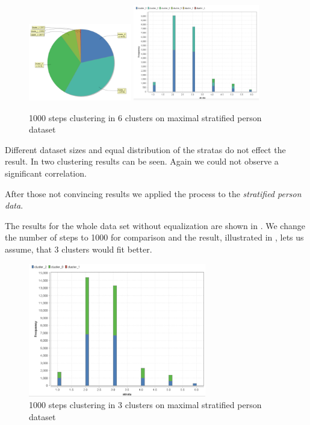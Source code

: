 \begin{figure}[H]
	\centering
	\includegraphics[width=0.4\textwidth]{vectorclusteringcluster1000.PNG}
	\includegraphics[width=0.49\textwidth]{vectorClustering1000.PNG}
	\caption{1000 steps clustering in 6 clusters on maximal stratified person dataset}
	\label{fig:1000vect}
\end{figure}

Different dataset sizes and equal distribution of the stratas do not effect the result. In   two clustering results can be seen. Again we could not observe a significant correlation.

After those not convincing results we applied the process to the \textit{stratified person data}.



The results for the whole data set without equalization are shown in . We change the number of steps to 1000 for comparison and the result, illustrated in , lets us assume, that 3 clusters would fit better. 


\begin{figure}[H]
\centering
\includegraphics[width=0.69\textwidth]{vectorClustering31000.PNG}
\caption{1000 steps clustering in 3 clusters on maximal stratified person dataset}
\label{fig:1000vect3}
\end{figure}


